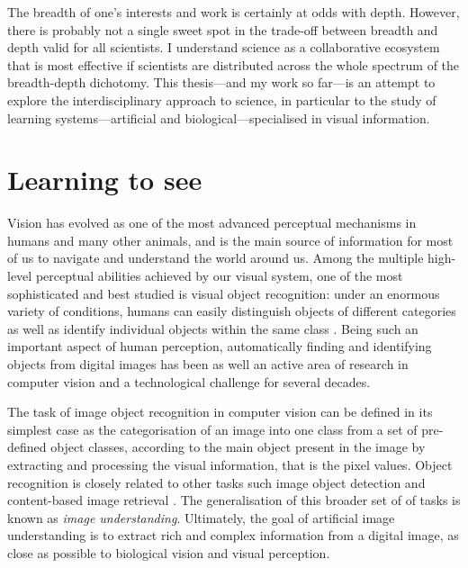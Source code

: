 {The breadth of one's interests and work is certainly at odds with depth. However, there is probably not a single sweet spot in the trade-off between breadth and depth valid for all scientists. I understand science as a collaborative ecosystem that is most effective if scientists are distributed across the whole spectrum of the breadth-depth dichotomy. This thesis---and my work so far---is an attempt to explore the interdisciplinary approach to science, in particular to the study of learning systems---artificial and biological---specialised in visual information.

\section{Learning to see}
\label{sec:intro-learning_to_see}
Vision has evolved as one of the most advanced perceptual mechanisms in humans and many other animals, and is the main source of information for most of us to navigate and understand the world around us. Among the multiple high-level perceptual abilities achieved by our visual system, one of the most sophisticated and best studied is visual object recognition: under an enormous variety of conditions, humans can easily distinguish objects of different categories as well as identify individual objects within the same class \citep{logothetis1996objectrecognition}. Being such an important aspect of human perception, automatically finding and identifying objects from digital images has been as well an active area of research in computer vision and a technological challenge for several decades.

The task of image object recognition in computer vision can be defined in its simplest case as the categorisation of an image into one class from a set of pre-defined object classes, according to the main object present in the image by extracting and processing the visual information, that is the pixel values. Object recognition is closely related to other tasks such image object detection \citep{zhao2019objectdetection} and content-based image retrieval \citep{latif2019imageretrieval, zhou2017imageretrieval}. The generalisation of this broader set of of tasks is known as \textit{image understanding}. Ultimately, the goal of artificial image understanding is to extract rich and complex information from a digital image, as close as possible to biological vision and visual perception.

}
